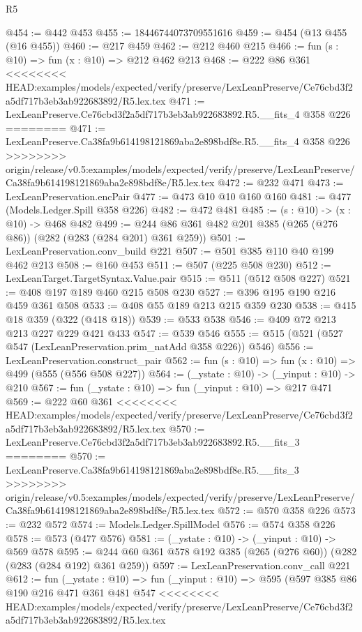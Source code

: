 \begin{lexlean}{R5}
\begin{coremodule}
{{{{{{{{{{{{{@454 := @442 @453
@455 := 18446744073709551616
@459 := @454 (@13 @455 (@16 @455))
@460 := @217 @459
@462 := @212 @460 @215
@466 := fun (s : @10) => fun (x : @10) => @212 @462 @213
@468 := @222 @86 @361
<<<<<<<< HEAD:examples/models/expected/verify/preserve/LexLeanPreserve/Ce76cbd3f2a5df717b3eb3ab922683892/R5.lex.tex
@471 := LexLeanPreserve.Ce76cbd3f2a5df717b3eb3ab922683892.R5.__fits_4 @358 @226
========
@471 := LexLeanPreserve.Ca38fa9b614198121869aba2e898bdf8e.R5.__fits_4 @358 @226
>>>>>>>> origin/release/v0.5:examples/models/expected/verify/preserve/LexLeanPreserve/Ca38fa9b614198121869aba2e898bdf8e/R5.lex.tex
@472 := @232 @471
@473 := LexLeanPreservation.encPair
@477 := @473 @10 @10 @160 @160
@481 := @477 (Models.Ledger.Spill @358 @226)
@482 := @472 @481
@485 := (s : @10) -> (x : @10) -> @468 @482
@499 := @244 @86 @361 @482 @201 @385 (@265 (@276 @86)) (@282 (@283 (@284 @201) @361 @259))
@501 := LexLeanPreservation.conv_build @221
@507 := @501 @385 @110 @40 @199 @462 @213
@508 := @160 @453
@511 := @507 (@225 @508 @230)
@512 := LexLeanTarget.TargetSyntax.Value.pair
@515 := @511 (@512 @508 @227)
@521 := @408 @197 @189 @460 @215 @508 @230
@527 := @396 @195 @190 @216 @459 @361 @508
@533 := @408 @55 @189 @213 @215 @359 @230
@538 := @415 @18 @359 (@322 (@418 @18))
@539 := @533 @538
@546 := @409 @72 @213 @213 @227 @229 @421 @433
@547 := @539 @546
@555 := @515 (@521 (@527 @547 (LexLeanPreservation.prim_natAdd @358 @226)) @546)
@556 := LexLeanPreservation.construct_pair
@562 := fun (s : @10) => fun (x : @10) => @499 (@555 (@556 @508 @227))
@564 := (_ystate : @10) -> (_yinput : @10) -> @210
@567 := fun (_ystate : @10) => fun (_yinput : @10) => @217 @471
@569 := @222 @60 @361
<<<<<<<< HEAD:examples/models/expected/verify/preserve/LexLeanPreserve/Ce76cbd3f2a5df717b3eb3ab922683892/R5.lex.tex
@570 := LexLeanPreserve.Ce76cbd3f2a5df717b3eb3ab922683892.R5.__fits_3
========
@570 := LexLeanPreserve.Ca38fa9b614198121869aba2e898bdf8e.R5.__fits_3
>>>>>>>> origin/release/v0.5:examples/models/expected/verify/preserve/LexLeanPreserve/Ca38fa9b614198121869aba2e898bdf8e/R5.lex.tex
@572 := @570 @358 @226
@573 := @232 @572
@574 := Models.Ledger.SpillModel
@576 := @574 @358 @226
@578 := @573 (@477 @576)
@581 := (_ystate : @10) -> (_yinput : @10) -> @569 @578
@595 := @244 @60 @361 @578 @192 @385 (@265 (@276 @60)) (@282 (@283 (@284 @192) @361 @259))
@597 := LexLeanPreservation.conv_call @221
@612 := fun (_ystate : @10) =>
  fun (_yinput : @10) =>
  @595
    (@597
      @385
      @86
      @190
      @216
      @471
      @361
      @481
      @547
<<<<<<<< HEAD:examples/models/expected/verify/preserve/LexLeanPreserve/Ce76cbd3f2a5df717b3eb3ab922683892/R5.lex.tex
}}}}}}}}}}}}}
\end{coremodule}
\end{lexlean}
